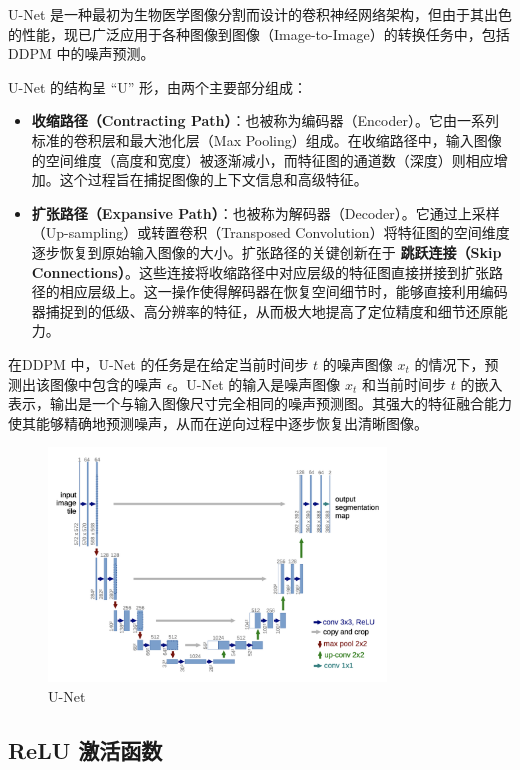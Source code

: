 \documentclass{ctexart}
\begin{document}
U-Net 是一种最初为生物医学图像分割而设计的卷积神经网络架构，但由于其出色的性能，现已广泛应用于各种图像到图像（Image-to-Image）的转换任务中，包括 DDPM 中的噪声预测。


U-Net 的结构呈 “U” 形，由两个主要部分组成：
\begin{itemize}
    \item \textbf{收缩路径（Contracting Path）}：也被称为编码器（Encoder）。它由一系列标准的卷积层和最大池化层（Max Pooling）组成。在收缩路径中，输入图像的空间维度（高度和宽度）被逐渐减小，而特征图的通道数（深度）则相应增加。这个过程旨在捕捉图像的上下文信息和高级特征。
    \item \textbf{扩张路径（Expansive Path）}：也被称为解码器（Decoder）。它通过上采样（Up-sampling）或转置卷积（Transposed Convolution）将特征图的空间维度逐步恢复到原始输入图像的大小。扩张路径的关键创新在于 \textbf{跳跃连接（Skip Connections）}。这些连接将收缩路径中对应层级的特征图直接拼接到扩张路径的相应层级上。这一操作使得解码器在恢复空间细节时，能够直接利用编码器捕捉到的低级、高分辨率的特征，从而极大地提高了定位精度和细节还原能力。
\end{itemize}

在DDPM 中，U-Net 的任务是在给定当前时间步 $t$ 的噪声图像 $x_t$ 的情况下，预测出该图像中包含的噪声 $\epsilon$。U-Net 的输入是噪声图像 $x_t$ 和当前时间步 $t$ 的嵌入表示，输出是一个与输入图像尺寸完全相同的噪声预测图。其强大的特征融合能力使其能够精确地预测噪声，从而在逆向过程中逐步恢复出清晰图像。

 \begin{figure}[H]
     \centering
     \includegraphics[width=0.8\textwidth]{unet.png}
     \caption{U-Net}
     \label{fig:unet}
 \end{figure}

\subsection{ReLU 激活函数}
\end{document}
